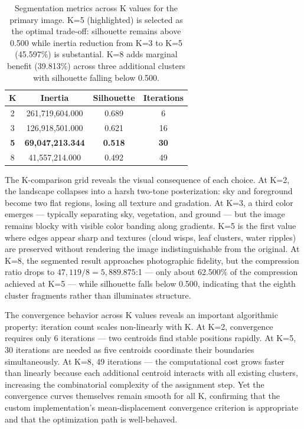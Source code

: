 \begin{table}[H]
\centering{}
\begin{tabular}{c c c c}
\toprule\rowcolor{tablehead!80}\color{white}\textbf{K} &\color{white}\textbf{Inertia} &\color{white}\textbf{Silhouette} &\color{white}\textbf{Iterations}\\
\midrule
2 & 261{,}719{,}604.000 & 0.689 & 6\\
3 & 126{,}918{,}501.000 & 0.621 & 16\\
\rowcolor{greenaccent!15}\textbf{5} & \textbf{69{,}047{,}213.344} & \textbf{0.518} & \textbf{30}\\
8 & 41{,}557{,}214.000 & 0.492 & 49\\
\bottomrule
\end{tabular}
\caption{Segmentation metrics across K values for the primary image. K=5 (highlighted) is selected as the optimal trade-off: silhouette remains above 0.500 while inertia reduction from K=3 to K=5 (45.597\%) is substantial. K=8 adds marginal benefit (39.813\%) across three additional clusters with silhouette falling below 0.500.}
\end{table}

The K-comparison grid reveals the visual consequence of each choice. At K=2, the landscape collapses into a harsh two-tone posterization: sky and foreground become two flat regions, losing all texture and gradation. At K=3, a third color emerges — typically separating sky, vegetation, and ground — but the image remains blocky with visible color banding along gradients. K=5 is the first value where edges appear sharp and textures (cloud wisps, leaf clusters, water ripples) are preserved without rendering the image indistinguishable from the original. At K=8, the segmented result approaches photographic fidelity, but the compression ratio drops to $47{,}119 / 8 = 5{,}889.875$:1 — only about 62.500\% of the compression achieved at K=5 — while silhouette falls below 0.500, indicating that the eighth cluster fragments rather than illuminates structure.

The convergence behavior across K values reveals an important algorithmic property: iteration count scales non-linearly with K. At K=2, convergence requires only 6 iterations — two centroids find stable positions rapidly. At K=5, 30 iterations are needed as five centroids coordinate their boundaries simultaneously. At K=8, 49 iterations — the computational cost grows faster than linearly because each additional centroid interacts with all existing clusters, increasing the combinatorial complexity of the assignment step. Yet the convergence curves themselves remain smooth for all K, confirming that the custom implementation's mean-displacement convergence criterion is appropriate and that the optimization path is well-behaved.

